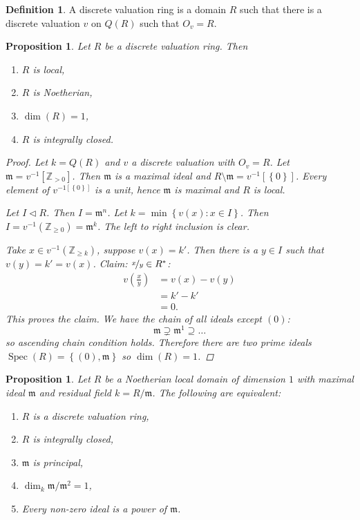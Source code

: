 \documentclass{article}
\newcommand{\Z}{\mathbb{Z}}
\newcommand{\set}[1]{\left\{#1\right\}}
\newcommand{\setwith}[2]{\left\{#1:#2\right\}}
\DeclareMathOperator{\Spec}{Spec}
\newcommand{\maxid}{\mathfrak{m}}
\newcommand{\ideal}{\triangleleft}
\newtheorem{proposition}[theorem]{Proposition}
\theoremstyle{definition}
\newtheorem{definition}[theorem]{Definition}
\begin{document}
\begin{definition}
    A discrete valuation ring is a domain \(R\) such that there is a discrete
    valuation \(v\) on \(Q(R)\) such that \(O_{v}=R\).
\end{definition}

\begin{proposition}
    Let \(R\) be a discrete valuation ring. Then
    \begin{enumerate}
        \item \(R\) is local,
        \item \(R\) is Noetherian,
        \item \(\dim(R)=1\),
        \item \(R\) is integrally closed.
    \end{enumerate}

    \begin{proof}
        Let \(k=Q(R)\) and \(v\) a discrete valuation with \(O_{v}=R\). Let
        \(\maxid=v^{-1}[\Z_{>0}]\). Then \(\maxid\) is a maximal ideal and
        \(R\setminus\maxid=v^{-1}[\set{0}]\). Every element of
        \(v^{-1[\set{0}]}\) is a unit, hence \(\maxid\) is maximal and \(R\) is
        local.

        Let \(I\ideal R\). Then \(I=\maxid^{n}\). Let
        \(k=\min\setwith{v(x)}{x\in I}\). Then \(I=v^{-1}(\Z_{\geq
            0})=\maxid^{k}\). The left to right inclusion is clear.

        Take \(x\in v^{-1}(\Z_{\geq k})\), suppose \(v(x)=k'\). Then there is a
        \(y\in I\) such that \(v(y)=k'=v(x)\). Claim: \(\nicefrac{x}{y}\in
        R^{*}\):
        \begin{align*}
            v\left(\frac{x}{y}\right) & =v(x)-v(y) \\
                                      & =k'-k'     \\
                                      & =0.
        \end{align*}
        This proves the claim. We have the chain of all ideals except \((0)\):
        \[
            \maxid\supsetneq\maxid^{1}\supseteq\ldots
        \]
        so ascending chain condition holds. Therefore there are two prime ideals
        \(\Spec(R)=\set{(0),\maxid}\) so \(\dim(R)=1\).
    \end{proof}
\end{proposition}

\begin{proposition}
    Let \(R\) be a Noetherian local domain of dimension \(1\) with maximal ideal
    \(\maxid\) and residual field \(k=R/\maxid\). The following are equivalent:
    \begin{enumerate}
        \item \(R\) is a discrete valuation ring,
        \item \(R\) is integrally closed,
        \item \(\maxid\) is principal,
        \item \(\dim_{k}\maxid/\maxid^{2}=1\),
        \item Every non-zero ideal is a power of \(\maxid\).
    \end{enumerate}
\end{proposition}
\end{document}

